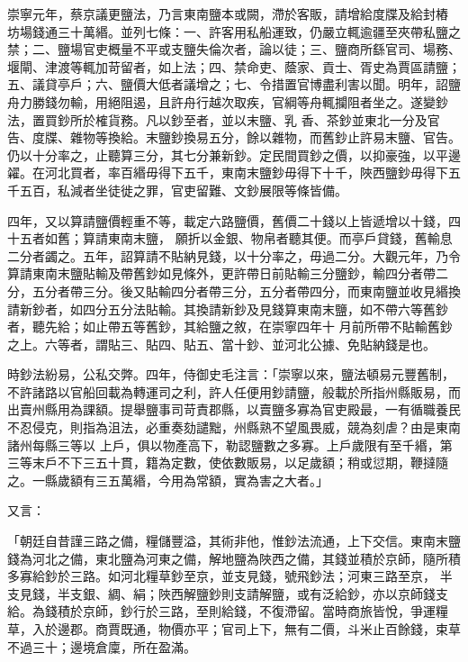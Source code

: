 \begin{pinyinscope}
 崇寧元年，蔡京議更鹽法，乃言東南鹽本或闕，滯於客販，請增給度牒及給封樁
 坊場錢通三十萬緡。並列七條：一、許客用私船運致，仍嚴立輒逾疆至夾帶私鹽之禁；二、鹽場官吏概量不平或支鹽失倫次者，論以徒；三、鹽商所繇官司、場務、堰閘、津渡等輒加苛留者，如上法；四、禁命吏、蔭家、貢士、胥史為賈區請鹽；五、議貸亭戶；六、鹽價大低者議增之；七、令措置官博盡利害以聞。明年，詔鹽舟力勝錢勿輸，用絕阻遏，且許舟行越次取疾，官綱等舟輒攔阻者坐之。遂變鈔法，置買鈔所於榷貨務。凡以鈔至者，並以末鹽、乳
 香、茶鈔並東北一分及官告、度牒、雜物等換給。末鹽鈔換易五分，餘以雜物，而舊鈔止許易末鹽、官告。仍以十分率之，止聽算三分，其七分兼新鈔。定民間買鈔之價，以抑豪強，以平邊糴。在河北買者，率百緡毋得下五千，東南末鹽鈔毋得下十千，陜西鹽鈔毋得下五千五百，私減者坐徒徙之罪，官吏留難、文鈔展限等條皆備。



 四年，又以算請鹽價輕重不等，載定六路鹽價，舊價二十錢以上皆遞增以十錢，四十五者如舊；算請東南末鹽，
 願折以金銀、物帛者聽其便。而亭戶貸錢，舊輸息二分者蠲之。五年，詔算請不貼納見錢，以十分率之，毋過二分。大觀元年，乃令算請東南末鹽貼輸及帶舊鈔如見條外，更許帶日前貼輸三分鹽鈔，輸四分者帶二分，五分者帶三分。後又貼輸四分者帶三分，五分者帶四分，而東南鹽並收見緡換請新鈔者，如四分五分法貼輸。其換請新鈔及見錢算東南末鹽，如不帶六等舊鈔者，聽先給；如止帶五等舊鈔，其給鹽之敘，在崇寧四年十
 月前所帶不貼輸舊鈔之上。六等者，謂貼三、貼四、貼五、當十鈔、並河北公據、免貼納錢是也。



 時鈔法紛易，公私交弊。四年，侍御史毛注言：「崇寧以來，鹽法頓易元豐舊制，不許諸路以官船回載為轉運司之利，許人任便用鈔請鹽，般載於所指州縣販易，而出賣州縣用為課額。提舉鹽事司苛責郡縣，以賣鹽多寡為官吏殿最，一有循職養民不忍侵克，則指為沮法，必重奏劾譴黜，州縣熟不望風畏威，競為刻虐？由是東南諸州每縣三等以
 上戶，俱以物產高下，勒認鹽數之多寡。上戶歲限有至千緡，第三等末戶不下三五十貫，籍為定數，使依數販易，以足歲額；稍或愆期，鞭撻隨之。一縣歲額有三五萬緡，今用為常額，實為害之大者。」



 又言：



 「朝廷自昔謹三路之備，糧儲豐溢，其術非他，惟鈔法流通，上下交信。東南末鹽錢為河北之備，東北鹽為河東之備，解地鹽為陜西之備，其錢並積於京師，隨所積多寡給鈔於三路。如河北糧草鈔至京，並支見錢，號飛鈔法；河東三路至京，
 半支見錢，半支銀、綢、絹；陜西解鹽鈔則支請解鹽，或有泛給鈔，亦以京師錢支給。為錢積於京師，鈔行於三路，至則給錢，不復滯留。當時商旅皆悅，爭運糧草，入於邊郡。商賈既通，物價亦平；官司上下，無有二價，斗米止百餘錢，束草不過三十；邊境倉廩，所在盈滿。




\end{pinyinscope}
